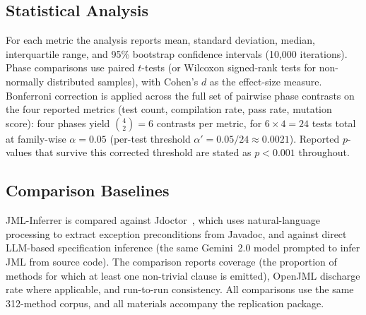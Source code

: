 \subsection{Statistical Analysis}

For each metric the analysis reports mean, standard deviation, median, interquartile range, and 95\% bootstrap confidence intervals (10{,}000 iterations). Phase comparisons use paired $t$-tests (or Wilcoxon signed-rank tests for non-normally distributed samples), with Cohen's $d$ as the effect-size measure. Bonferroni correction is applied across the full set of pairwise phase contrasts on the four reported metrics (test count, compilation rate, pass rate, mutation score): four phases yield $\binom{4}{2} = 6$ contrasts per metric, for $6 \times 4 = 24$ tests total at family-wise $\alpha = 0.05$ (per-test threshold $\alpha' = 0.05/24 \approx 0.0021$). Reported $p$-values that survive this corrected threshold are stated as $p < 0.001$ throughout.

\subsection{Comparison Baselines}

JML-Inferrer is compared against Jdoctor~\cite{jdoctor2018}, which uses natural-language processing to extract exception preconditions from Javadoc, and against direct LLM-based specification inference (the same Gemini~2.0 model prompted to infer JML from source code). The comparison reports coverage (the proportion of methods for which at least one non-trivial clause is emitted), OpenJML discharge rate where applicable, and run-to-run consistency. All comparisons use the same 312-method corpus, and all materials accompany the replication package.
